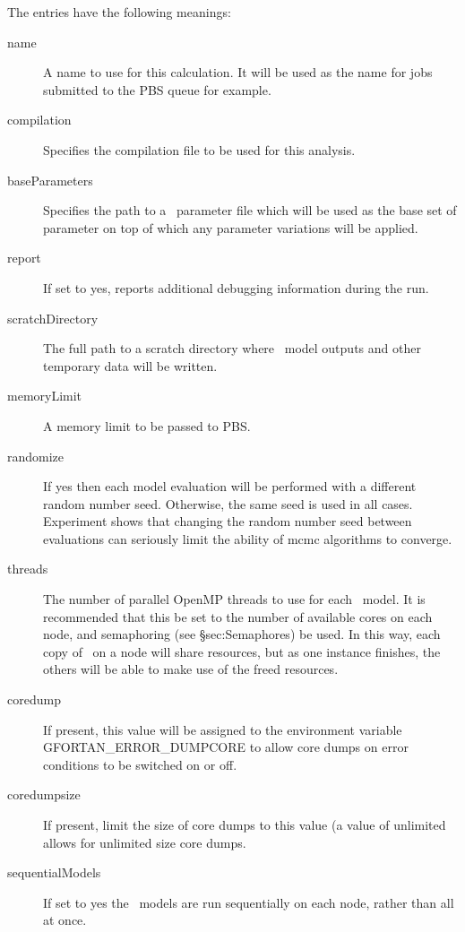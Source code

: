 The entries have the following meanings:
\begin{description}
\item[{\normalfont \ttfamily name}] A name to use for this calculation. It will be used as the name for jobs submitted to the PBS queue for example.
\item[{\normalfont \ttfamily compilation}] Specifies the compilation file to be used for this analysis.
\item[{\normalfont \ttfamily baseParameters}] Specifies the path to a \glc\ parameter file which will be used as the base set of parameter on top of which any parameter variations will be applied.
\item[{\normalfont \ttfamily report}] If set to {\normalfont \ttfamily yes}, reports additional debugging information during the run.
\item[{\normalfont \ttfamily scratchDirectory}] The full path to a scratch directory where \glc\ model outputs and other temporary data will be written.
\item[{\normalfont \ttfamily memoryLimit}] A memory limit to be passed to PBS.
\item[{\normalfont \ttfamily randomize}] If {\normalfont \ttfamily yes} then each model evaluation will be performed with a different random number seed. Otherwise, the same seed is used in all cases. Experiment shows that changing the random number seed between evaluations can seriously limit the ability of \gls{mcmc} algorithms to converge.
\item[{\normalfont \ttfamily threads}] The number of parallel OpenMP threads to use for each \glc\ model. It is recommended that this be set to the number of available cores on each node, and semaphoring (see \S{sec:Semaphores}) be used. In this way, each copy of \glc\ on a node will share resources, but as one instance finishes, the others will be able to make use of the freed resources.
\item[{\normalfont \ttfamily coredump}] If present, this value will be assigned to the environment variable {\normalfont \ttfamily GFORTAN\_ERROR\_DUMPCORE} to allow core dumps on error conditions to be switched on or off.
\item[{\normalfont \ttfamily coredumpsize}] If present, limit the size of core dumps to this value (a value of {\normalfont \ttfamily unlimited} allows for unlimited size core dumps.
\item[{\normalfont \ttfamily sequentialModels}] If set to {\normalfont \ttfamily yes} the \glc\ models are run sequentially on each node, rather than all at once.  

\end{description}
